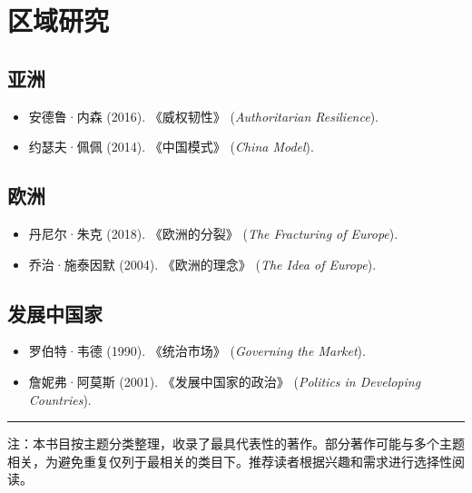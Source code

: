 \documentclass[a5paper, 11pt, openany]{ctexbook}
\begin{document}
\section*{区域研究}

\subsection*{亚洲}
\begin{itemize}
    \item 安德鲁·内森 (2016). 《威权韧性》 (\textit{Authoritarian Resilience}).
    \item 约瑟夫·佩佩 (2014). 《中国模式》 (\textit{China Model}).
\end{itemize}

\subsection*{欧洲}
\begin{itemize}
    \item 丹尼尔·朱克 (2018). 《欧洲的分裂》 (\textit{The Fracturing of Europe}).
    \item 乔治·施泰因默 (2004). 《欧洲的理念》 (\textit{The Idea of Europe}).
\end{itemize}

\subsection*{发展中国家}
\begin{itemize}
    \item 罗伯特·韦德 (1990). 《统治市场》 (\textit{Governing the Market}).
    \item 詹妮弗·阿莫斯 (2001). 《发展中国家的政治》 (\textit{Politics in Developing Countries}).
\end{itemize}

\bigskip
\hrule
\bigskip
\begin{center}
注：本书目按主题分类整理，收录了最具代表性的著作。部分著作可能与多个主题相关，为避免重复仅列于最相关的类目下。推荐读者根据兴趣和需求进行选择性阅读。
\end{center}
\end{document}
